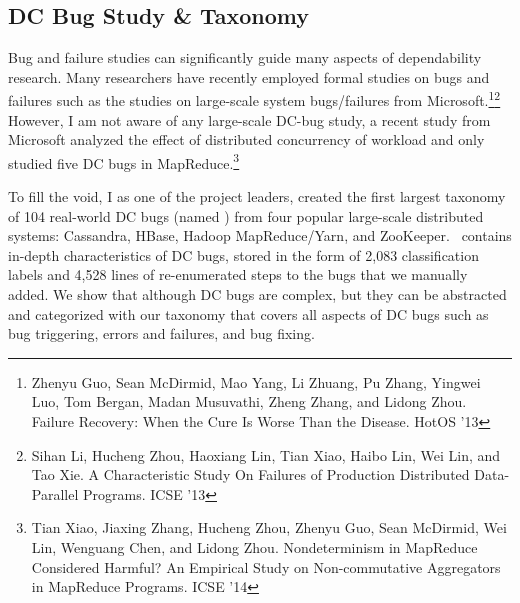 \documentclass[10pt]{article}
\begin{document}
\subsection{DC Bug Study \& Taxonomy} 

Bug and failure studies can significantly guide many aspects of dependability
research. Many researchers have recently employed formal studies on bugs and
failures such as the studies on large-scale system bugs/failures from
Microsoft.\footnote{Zhenyu Guo, Sean McDirmid, Mao Yang, Li Zhuang, Pu Zhang,
Yingwei Luo, Tom Bergan, Madan Musuvathi, Zheng Zhang, and Lidong Zhou. Failure
Recovery: When the Cure Is Worse Than the Disease. HotOS '13}\footnote{Sihan Li,
Hucheng Zhou, Haoxiang Lin, Tian Xiao, Haibo Lin, Wei Lin, and Tao Xie. A
Characteristic Study On Failures of Production Distributed Data-Parallel
Programs. ICSE '13}
%
However, I am not aware of any large-scale DC-bug study, a recent study from
Microsoft analyzed the effect of distributed concurrency of workload and only
studied five DC bugs in MapReduce.\footnote{Tian Xiao, Jiaxing Zhang, Hucheng
Zhou, Zhenyu Guo, Sean McDirmid, Wei Lin, Wenguang Chen, and Lidong Zhou.
Nondeterminism in MapReduce Considered Harmful? An Empirical Study on
Non-commutative Aggregators in MapReduce Programs. ICSE '14}

To fill the void, I as one of the project leaders, created the first largest
taxonomy of 104 real-world DC bugs (named \taxdc)
\cite{Leesatapornwongsa+16-TaxDC} from four popular large-scale distributed
systems: Cassandra, HBase, Hadoop MapReduce/Yarn, and ZooKeeper.  \taxdc\
contains in-depth characteristics of DC bugs, stored in the form of 2,083
classification labels and 4,528 lines of re-enumerated steps to the bugs that
we manually added. We show that although DC bugs are complex, but they can be
abstracted and categorized with our taxonomy that covers all aspects of DC bugs
such as bug triggering, errors and failures, and bug fixing.


%
\end{document}
